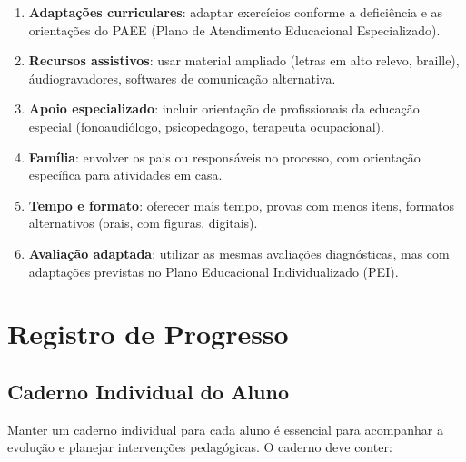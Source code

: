 \begin{enumerate}[leftmargin=2cm]
  \item \textbf{Adapta\c{c}\~{o}es curriculares}: adaptar exerc\'{i}cios
  conforme a defici\^{e}ncia e as orienta\c{c}\~{o}es do PAEE
  (Plano de Atendimento Educacional Especializado).

  \item \textbf{Recursos assistivos}: usar material ampliado (letras em
  alto relevo, braille), \'{a}udiogravadores, softwares de
  comunica\c{c}\~{a}o alternativa.

  \item \textbf{Apoio especializado}: incluir orienta\c{c}\~{a}o de
  profissionais da educa\c{c}\~{a}o especial (fonoaudi\'{o}logo,
  psicopedagogo, terapeuta ocupacional).

  \item \textbf{Fam\'{i}lia}: envolver os pais ou respons\'{a}veis no
  processo, com orienta\c{c}\~{a}o espec\'{i}fica para atividades em casa.

  \item \textbf{Tempo e formato}: oferecer mais tempo, provas com menos
  itens, formatos alternativos (orais, com figuras, digitais).

  \item \textbf{Avalia\c{c}\~{a}o adaptada}: utilizar as mesmas
  avalia\c{c}\~{o}es diagn\'{o}sticas, mas com adapta\c{c}\~{o}es
  previstas no Plano Educacional Individualizado (PEI).
\end{enumerate}


\chapter{Registro de Progresso}

\section{Caderno Individual do Aluno}

Manter um caderno individual para cada aluno \'{e} essencial para
acompanhar a evolu\c{c}\~{a}o e planejar interven\c{c}\~{o}es
pedag\'{o}gicas. O caderno deve conter:

